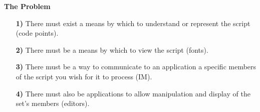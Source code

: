 \documentclass[a4paper]{slides}
\begin{document}
\pagestyle{empty}

\begin{slide}

\centerline{\Huge\bf The Problem} 
\vspace{0.8in}

\begin{itemize}
  \item[{\bf 1)}] 
    There must exist a means by which to understand or represent the 
    script (code points).
  \item[{\bf 2)}] 
    There must be a means by which to view the script (fonts).
  \item[{\bf 3)}] 
    There must be a way to communicate to an application
    a specific members of the script you wish for it to process (IM).
  \item[{\bf 4)}] 
   There must also be applications to allow manipulation and display of
   the set's members (editors).
\end{itemize}

\end{slide}
\end{document}

